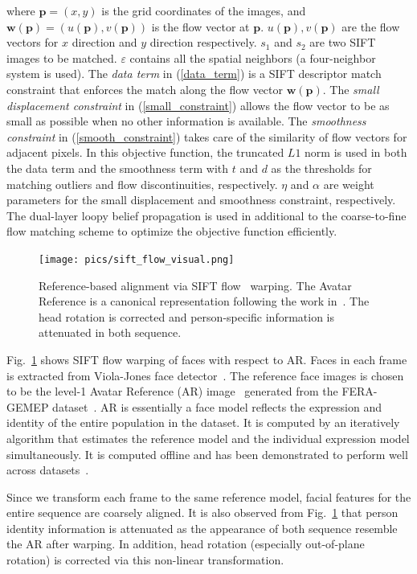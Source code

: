 \documentclass[journal]{IEEEtran}
\begin{document}
\noindent where $\textbf{p}=(x,y)$ is the grid coordinates of the images, and $\textbf{w}(\textbf{p})=(u(\textbf{p}),v(\textbf{p}))$ is the flow vector at $\textbf{p}$. $u(\textbf{p}),v(\textbf{p})$ are the flow vectors for $x$ direction and $y$ direction respectively. $s_1$ and $s_2$ are two SIFT images to be matched. $\varepsilon$ contains all the spatial neighbors (a four-neighbor system is used). The \emph{data term} in (\ref{data_term}) is a SIFT descriptor match constraint that enforces the match along the flow vector $\textbf{w}(\textbf{p})$. The \emph{small displacement constraint} in (\ref{small_constraint}) allows the flow vector to be as small as possible when no other information is available. The \emph{smoothness constraint} in (\ref{smooth_constraint}) takes care of the similarity of flow vectors for adjacent pixels. In this objective function, the truncated $L1$ norm is used in both the data term and the smoothness term with $t$ and $d$ as the thresholds for matching outliers and flow discontinuities, respectively. $\eta$ and $\alpha$ are weight parameters for the small displacement and smoothness constraint, respectively. The dual-layer loopy belief propagation is used in additional to the coarse-to-fine flow matching scheme to optimize the objective function efficiently.

\begin{figure}[htbp]
	\centering
		\texttt{[image: pics/sift\_flow\_visual.png]}
	\caption{Reference-based alignment via SIFT flow~\cite{Liu_PAMI11} warping. The Avatar Reference is a canonical representation following the work in~\cite{Yang_SMCB12}. The head rotation is corrected and person-specific information is attenuated in both sequence.}
	\label{fig:sift_flow_visual}
\end{figure}


Fig.~\ref{fig:sift_flow_visual} shows SIFT flow warping of faces with respect to AR. Faces in each frame is extracted from Viola-Jones face detector~\cite{Viola_IJCV04}. The reference face images is chosen to be the level-1 Avatar Reference (AR) image~\cite{Yang_SMCB12} generated from the FERA-GEMEP dataset~\cite{Valstar_FERA11}. AR is essentially a face model reflects the expression and identity of the entire population in the dataset. It is computed by an iteratively algorithm that estimates the reference model and the individual expression model simultaneously. It is computed offline and has been demonstrated to perform well across datasets~\cite{Yang_SMCB12}. 

Since we transform each frame to the same reference model, facial features for the entire sequence are coarsely aligned. It is also observed from Fig.~\ref{fig:sift_flow_visual} that person identity information is attenuated as the appearance of both sequence resemble the AR after warping. In addition, head rotation (especially out-of-plane rotation) is corrected via this non-linear transformation. 
\end{document}
